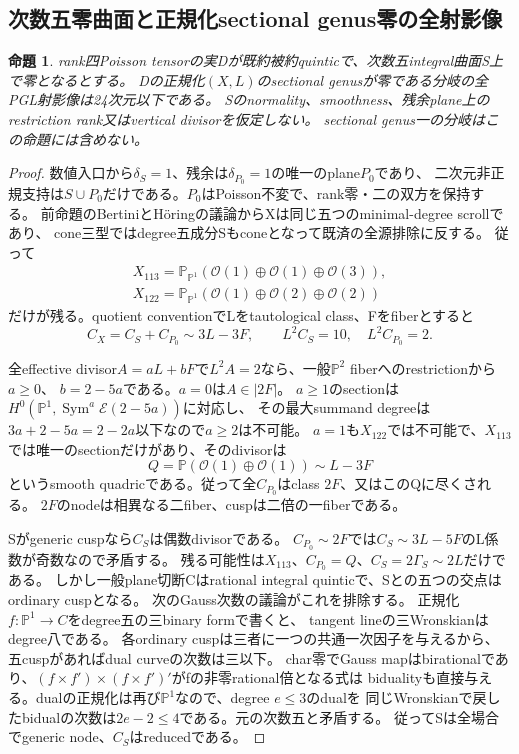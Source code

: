 \documentclass[a4paper,11pt]{ltjsarticle}
\newtheorem{proposition}{命題}[section]
\theoremstyle{definition}
\begin{document}
\subsection{次数五零曲面と正規化sectional genus零の全射影像}
\begin{proposition}\label{prop:quintic-rankzero-genuszero-G}
rank四Poisson tensorの実Dが既約被約quinticで、次数五integral曲面S上で零となるとする。
Dの正規化$(X,L)$のsectional genusが零である分岐の全PGL射影像は24次元以下である。
Sのnormality、smoothness、残余plane上のrestriction rank又はvertical divisorを仮定しない。
sectional genus一の分岐はこの命題には含めない。
\end{proposition}
\begin{proof}
数値入口から$\delta_S=1$、残余は$\delta_{P_0}=1$の唯一のplane$P_0$であり、
二次元非正規支持は$S\cup P_0$だけである。$P_0$はPoisson不変で、rank零・二の双方を保持する。
前命題のBertiniとHöringの議論からXは同じ五つのminimal-degree scrollであり、
cone三型ではdegree五成分Sもconeとなって既済の全源排除に反する。
従って
\[
 \begin{gathered}
 X_{113}=\mathbb P_{\mathbb P^1}(\mathcal O(1)\oplus\mathcal O(1)\oplus\mathcal O(3)),\\
 X_{122}=\mathbb P_{\mathbb P^1}(\mathcal O(1)\oplus\mathcal O(2)\oplus\mathcal O(2))
 \end{gathered}
\]
だけが残る。quotient conventionでLをtautological class、Fをfiberとすると
\[
 C_X=C_S+C_{P_0}\sim3L-3F,\qquad L^2C_S=10,\quad L^2C_{P_0}=2.
\]

全effective divisor$A=aL+bF$で$L^2A=2$なら、一般$\mathbb P^2$ fiberへのrestrictionから$a\ge0$、
$b=2-5a$である。$a=0$は$A\in|2F|$。
$a\ge1$のsectionは$H^0(\mathbb P^1,\operatorname{Sym}^a\mathcal E(2-5a))$に対応し、
その最大summand degreeは$3a+2-5a=2-2a$以下なので$a\ge2$は不可能。
$a=1$も$X_{122}$では不可能で、$X_{113}$では唯一のsectionだけがあり、そのdivisorは
\[
 Q=\mathbb P(\mathcal O(1)\oplus\mathcal O(1))\sim L-3F
\]
というsmooth quadricである。従って全$C_{P_0}$はclass $2F$、又はこのQに尽くされる。
$2F$のnodeは相異なる二fiber、cuspは二倍の一fiberである。

Sがgeneric cuspなら$C_S$は偶数divisorである。
$C_{P_0}\sim2F$では$C_S\sim3L-5F$のL係数が奇数なので矛盾する。
残る可能性は$X_{113}$、$C_{P_0}=Q$、$C_S=2\Gamma_S\sim2L$だけである。
しかし一般plane切断Cはrational integral quinticで、Sとの五つの交点はordinary cuspとなる。
次のGauss次数の議論がこれを排除する。
正規化$f:\mathbb P^1\to C$をdegree五の三binary formで書くと、
tangent lineの三Wronskianはdegree八である。
各ordinary cuspは三者に一つの共通一次因子を与えるから、五cuspがあればdual curveの次数は三以下。
char零でGauss mapはbirationalであり、$(f\times f')\times(f\times f')'$がfの非零rational倍となる式は
bidualityも直接与える。dualの正規化は再び$\mathbb P^1$なので、degree $e\le3$のdualを
同じWronskianで戻したbidualの次数は$2e-2\le4$である。元の次数五と矛盾する。
従ってSは全場合でgeneric node、$C_S$はreducedである。


\end{proof}
\end{document}
